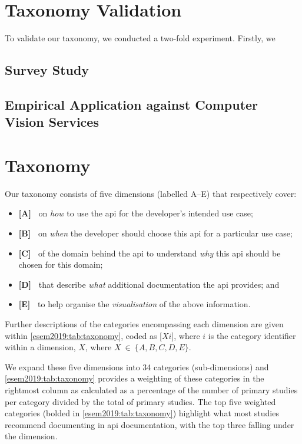 
\section{Taxonomy Validation}
\label{esem2019:sec:validation}

 To validate our taxonomy, we conducted a two-fold experiment. Firstly, we 

\subsection{Survey Study}

\subsection{Empirical Application against Computer Vision Services}

\section{Taxonomy}
\label{esem2019:sec:findings}

Our taxonomy consists of five dimensions (labelled A--E) that respectively cover:
\begin{itemize}
  \item \textbf{[A]~\dima{}} on \textit{how} to use the \gls{api} for the developer's intended use case;
  \item \textbf{[B]~\dimb{}} on \textit{when} the developer should choose this \gls{api} for a particular use case;
  \item \textbf{[C]~\dimc{}} of the domain behind the \gls{api} to understand \textit{why} this \gls{api} should be chosen for this domain;
  \item \textbf{[D]~\dimd{}} that describe \textit{what} additional documentation the \gls{api} provides; and
  \item \textbf{[E]~\dime{}} to help organise the \textit{visualisation} of the above information.
\end{itemize}
Further descriptions of the categories encompassing each dimension are given within \cref{esem2019:tab:taxonomy}, coded as [$Xi$], where $i$ is the category identifier within a dimension, $X$, where $X~\in~\{ A, B, C, D, E \}$.

We expand these five dimensions into 34 categories (sub-dimensions) and \cref{esem2019:tab:taxonomy} provides a weighting of these categories in the rightmost column as calculated as a percentage of the number of primary studies per category divided by the total of primary studies. The top five weighted categories (bolded in \cref{esem2019:tab:taxonomy}) highlight what most studies recommend documenting in \gls{api} documentation, with the top three falling under the \dima{} dimension.

